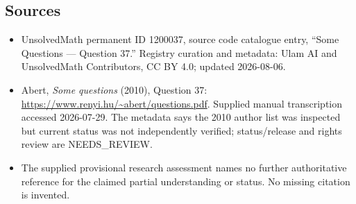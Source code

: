\documentclass[11pt]{article}
\begin{document}
\subsection{Sources}
\begin{itemize}
\item UnsolvedMath permanent ID 1200037, source code catalogue entry, ``Some Questions --- Question 37.'' Registry curation and metadata: Ulam AI and UnsolvedMath Contributors, CC BY 4.0; updated 2026-08-06.
\item Abert, \emph{Some questions} (2010), Question 37: \url{https://www.renyi.hu/~abert/questions.pdf}. Supplied manual transcription accessed 2026-07-29. The metadata says the 2010 author list was inspected but current status was not independently verified; status/release and rights review are NEEDS\_REVIEW.
\item The supplied provisional research assessment names no further authoritative reference for the claimed partial understanding or status. No missing citation is invented.
\end{itemize}
\end{document}
